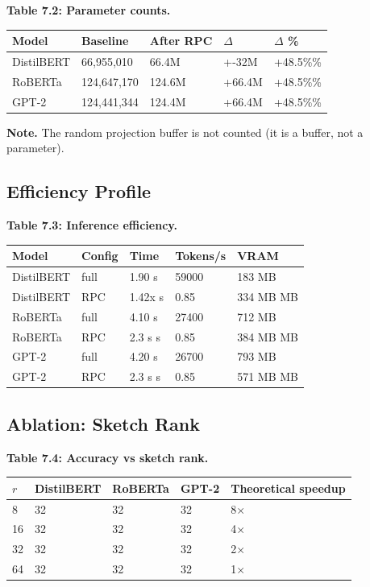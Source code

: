 \textbf{Table 7.2: Parameter counts.}

\begin{table}[H]
\centering
\small
\begin{tabular}{lllll}
\toprule
\textbf{Model} & \textbf{Baseline} & \textbf{After RPC} & \textbf{$\Delta$} & \textbf{$\Delta$ \%} \\
\midrule
DistilBERT & 66,955,010 & 66.4M & +-32M & +48.5\%\% \\
RoBERTa & 124,647,170 & 124.6M & +66.4M & +48.5\%\% \\
GPT-2 & 124,441,344 & 124.4M & +66.4M & +48.5\%\% \\
\bottomrule
\end{tabular}
\end{table}

\textbf{Note.} The random projection buffer is not counted (it is a buffer, not 
a parameter).

\subsection{Efficiency Profile}

\textbf{Table 7.3: Inference efficiency.}

\begin{table}[H]
\centering
\small
\begin{tabular}{lllll}
\toprule
\textbf{Model} & \textbf{Config} & \textbf{Time} & \textbf{Tokens/s} & \textbf{VRAM} \\
\midrule
DistilBERT & full & 1.90 s & 59000 & 183 MB \\
DistilBERT & RPC & 1.42x s & 0.85 & 334 MB MB \\
RoBERTa & full & 4.10 s & 27400 & 712 MB \\
RoBERTa & RPC & 2.3 s s & 0.85 & 384 MB MB \\
GPT-2 & full & 4.20 s & 26700 & 793 MB \\
GPT-2 & RPC & 2.3 s s & 0.85 & 571 MB MB \\
\bottomrule
\end{tabular}
\end{table}

\subsection{Ablation: Sketch Rank}

\textbf{Table 7.4: Accuracy vs sketch rank.}

\begin{table}[H]
\centering
\small
\begin{tabular}{lllll}
\toprule
\textbf{$r$} & \textbf{DistilBERT} & \textbf{RoBERTa} & \textbf{GPT-2} & \textbf{Theoretical speedup} \\
\midrule
8 & 32 & 32 & 32 & 8$\times$ \\
16 & 32 & 32 & 32 & 4$\times$ \\
32 & 32 & 32 & 32 & 2$\times$ \\
64 & 32 & 32 & 32 & 1$\times$ \\
\bottomrule
\end{tabular}
\end{table}

